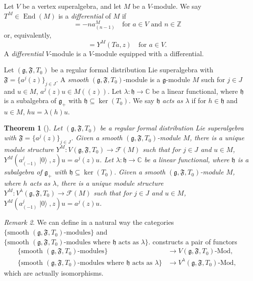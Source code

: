 \documentclass[a4paper, 12pt, reqno]{amsart}
\newtheorem{theorem}{Theorem}[section]
\theoremstyle{remark}
\newtheorem{remark}[theorem]{Remark}
\numberwithin{equation}{subsection}
\DeclareMathOperator{\End}{End}
\DeclareMathOperator{\vac}{|0\rangle}
\begin{document}
Let $V$ be a vertex superalgebra, and let $M$ be a $V$-module.
We say  $T^M \in \End(M)$ is a \emph{differential} of $M$ if
\begin{equation*}
  [T^M, a^M_{(n)}] = -na^M_{(n - 1)} \quad \text{for }a \in V\text{ and }n \in \mathbb{Z}
\end{equation*}
or, equivalently,
\begin{equation*}
  [T^M, Y^M(a, z)] = Y^M(Ta, z) \quad \text{for }a \in V.
\end{equation*}
A \emph{differential} $V$-module is a $V$-module equipped with a differential.

Let $(\mathfrak{g}, \mathfrak{F}, T_0)$ be a regular formal distribution Lie superalgebra with $\mathfrak{F} = \{a^j(z)\}_{j \in J}$.
A \emph{smooth} $(\mathfrak{g}, \mathfrak{F}, T_0)$-module is a $\mathfrak{g}$-module $M$ such for $j \in J$ and $u \in M$, $a^j(z)u \in M((z))$.
Let $\lambda: \mathfrak{h} \to \mathbb{C}$ be a linear functional, where $\mathfrak{h}$ is a subalgebra of $\mathfrak{g}_+$ with $\mathfrak{h} \subseteq \ker(T_0)$.
We say $\mathfrak{h}$ \emph{acts as $\lambda$} if for $h \in \mathfrak{h}$ and $u \in M$, $hu = \lambda(h)u$.

\begin{theorem}[{\cite[Theorem 2.15]{li_vertex_2004}}]
  \label{thr:25}
  Let $(\mathfrak{g}, \mathfrak{F}, T_0)$ be a regular formal distribution Lie superalgebra with $\mathfrak{F} = \{a^j(z)\}_{j \in J}$.
  Given a smooth $(\mathfrak{g}, \mathfrak{F}, T_0)$-module $M$, there is a unique module structure $Y^M: V(\mathfrak{g}, \mathfrak{F}, T_0) \to \mathcal{F}(M)$ such that for $j \in J$ and $u \in M$, $Y^M(a^j_{(-1)}\vac, z)u = a^j(z)u$.
  Let $\lambda: \mathfrak{h} \to \mathbb{C}$ be a linear functional, where $\mathfrak{h}$ is a subalgebra of $\mathfrak{g}_+$ with $\mathfrak{h} \subseteq \ker(T_0)$.
  Given a smooth $(\mathfrak{g}, \mathfrak{F}, T_0)$-module $M$, where $h$ acts as $\lambda$, there is a unique module structure $Y^M: V^{\lambda}(\mathfrak{g}, \mathfrak{F}, T_0) \to \mathcal{F}(M)$ such that for $j \in J$ and $u \in M$, $Y^M(a^j_{(-1)}\vac, z)u = a^j(z)u$.
\end{theorem}

\begin{remark}
  \label{rmk:22}
  We can define in a natural way the categories $\{\text{smooth }(\mathfrak{g}, \mathfrak{F}, T_0)\text{-modules}\}$ and $\{\text{smooth }(\mathfrak{g}, \mathfrak{F}, T_0)\text{-modules where }\mathfrak{h}\text{ acts as }\lambda\}$.
   constructs a pair of functors
  \begin{align*}
    \{\text{smooth }(\mathfrak{g}, \mathfrak{F}, T_0)\text{-modules}\} &\to V(\mathfrak{g}, \mathfrak{F}, T_0)\text{-Mod}, \\
    \{\text{smooth }(\mathfrak{g}, \mathfrak{F}, T_0)\text{-modules where }\mathfrak{h}\text{ acts as }\lambda\} &\to V^{\lambda}(\mathfrak{g}, \mathfrak{F}, T_0)\text{-Mod},
  \end{align*}
  which are actually isomorphisms.
\end{remark}
\end{document}
